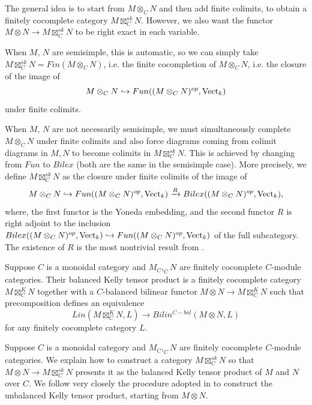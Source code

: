 \noindent The general idea is to start from $M\otimes_C N$ and then add finite
colimits, to obtain a finitely cocomplete category $M\boxtimes_C^{sk} N$.
However, we also want the functor $M\otimes N \to M\boxtimes^{sk}_C N$ to be
right exact in each variable.

When $M$, $N$ are semisimple, this is automatic, so we can simply take
$M\boxtimes_C^{sk} N = Fin(M\otimes_C N)$, i.e. the finite cocompletion of
$M\otimes_C N$, i.e. the closure of the image of $$M\otimes_C N\hookrightarrow
Fun((M\otimes_C N)^{op},\operatorname{Vect}_k)$$ under finite colimits.

When $M$, $N$ are not necessarily semisimple, we must simultaneously complete
$M\otimes_C N$ under finite colimits and also force diagrams coming from
colimit diagrams in $M, N$ to become colimits in $M \boxtimes_C^{sk} N$. This
is achieved by changing from $Fun$ to $Bilex$ (both are the same in the
semisimple case). More precisely, we define $M\boxtimes_C^{sk} N$ as the
closure under finite colimits of the image of
\[
  M \otimes_C N
  \hookrightarrow
  Fun((M\otimes_C N)^{op},\operatorname{Vect}_k)
  \xrightarrow{R}
  Bilex((M\otimes_C N)^{op},\operatorname{Vect}_k),
\]
where, the first functor is the Yoneda embedding, and the second functor $R$
is right adjoint to the inclusion $Bilex((M\otimes_C N)^{op},\operatorname{Vect}_k)
\hookrightarrow Fun((M\otimes_C N)^{op},\operatorname{Vect}_k)$ of the full subcategory. The
existence of $R$ is the most nontrivial result from
\cite{kelly/basic-concepts-enriched}.

\begin{definition}
  \noindent Suppose $C$ is a monoidal category and $M_C, _{C}N$ are finitely
  cocomplete $C$-module categories. Their balanced Kelly tensor product is a
  finitely cocomplete category $M\boxtimes^K_C N$ together with a $C$-balanced
  bilinear functor $M\otimes N\to M\boxtimes^K_C N$ such that precomposition
  defines an equivalence $$Lin(M\boxtimes^K_C N,L)\to Bilin^{C-bal}(M\otimes
  N, L)$$ for any finitely cocomplete category $L$.
\end{definition}

Suppose $C$ is a monoidal category and $M_C, _{C}N$ are finitely cocomplete
$C$-module categories. We explain how to construct a category
$M\boxtimes_C^{sk}N$ so that $M\otimes N\to M\boxtimes_C^{sk}N$ presents it as
the balanced Kelly tensor product of $M$ and $N$ over $C$. We follow very
closely the procedure adopted in \cite{lopezfranco/tensor-products} to
construct the unbalanced Kelly tensor product, starting from $M\otimes N$.

